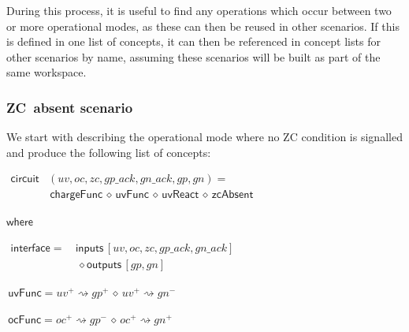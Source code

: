 \documentclass[british,compsoc]{IEEEtran}
\begin{document}
During this process, it is useful to find any operations which occur
between two or more operational modes, as these can then be reused
in other scenarios. If this is defined in one list of concepts, it
can then be referenced in concept lists for other scenarios by name, assuming these scenarios will be built as part of the same workspace.

\subsubsection{ZC~absent scenario}

We start with describing the operational mode where no ZC condition
is signalled and produce the following list of concepts:

\begin{minipage}[h]{1\columnwidth}%

\begin{flushleft}
$\begin{aligned}\mathsf{circuit}&(uv, oc, zc, gp\_ack, gn\_ack, gp, gn)= \\
& \,\mathsf{chargeFunc}\,\diamond\,\mathsf{uvFunc}\,\diamond\,\mathsf{uvReact}\,\diamond
\,\mathsf{zcAbsent}
\end{aligned}
$
\par\end{flushleft}%

\par\begin{flushleft}
$\mathsf{where}$
\par\end{flushleft}

\begin{flushleft}
$\begin{aligned}\mathsf{interface}=\,&\mathsf{inputs}\,[uv, oc, zc, gp\_ack, gn\_ack]\\
& \,\diamond \mathsf{outputs}\,[gp, gn]
\end{aligned}$
\par\end{flushleft}%

\begin{flushleft}
$\,\mathsf{uvFunc}=uv^{+}\rightsquigarrow gp^{+}\,\diamond\, uv^{+}\rightsquigarrow gn^{-}$
\par\end{flushleft}

\begin{flushleft}
$\,\mathsf{ocFunc}=oc^{+}\rightsquigarrow gp^{-}\,\diamond\, oc^{+}\rightsquigarrow gn^{+}$
\par\end{flushleft}


\end{minipage}
\end{document}
